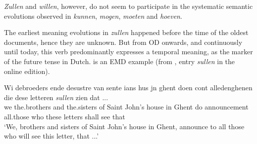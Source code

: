 \documentclass[output=paper]{langsci/langscibook}
\begin{document}
\textit{Zullen} and \textit{willen}, however, do not seem to participate in the systematic semantic evolutions observed in \textit{kunnen}, \textit{mogen}, \textit{moeten} and \textit{hoeven}.

The earliest meaning evolutions in \textit{zullen} happened before the time of the oldest documents, hence they are unknown. But from OD onwards, and continuously until today, this verb predominantly expresses a temporal meaning, as the marker of the future tense in Dutch.  is an EMD example (from \citet{PijnenburgEtAl2000}, entry \textit{sullen} in the online edition).

\ea%
    \label{ex:nuyts:17}
    \gll           Wi debroeders ende desustre van sente ians hus jn ghent doen cont alledenghenen die dese letteren \textit{sullen} zien dat ...\\
  we the.brothers and the.sisters of Saint John’s house in Ghent do announcement all.those who these letters shall see that\\
\glt   `We, brothers and sisters of Saint John’s house in Ghent, announce to all those who will see this letter, that ...'
\z
\end{document}
